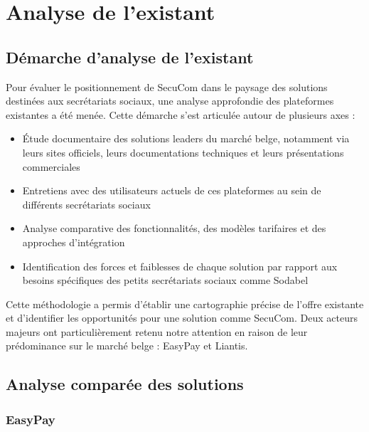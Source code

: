 \chapter{Analyse de l'existant}

\section{Démarche d'analyse de l'existant}

Pour évaluer le positionnement de SecuCom dans le paysage des solutions destinées aux secrétariats sociaux, une analyse approfondie des plateformes existantes a été menée. Cette démarche s'est articulée autour de plusieurs axes :

\begin{itemize}
  \item Étude documentaire des solutions leaders du marché belge, notamment via leurs sites officiels, leurs documentations techniques et leurs présentations commerciales
  \item Entretiens avec des utilisateurs actuels de ces plateformes au sein de différents secrétariats sociaux
  \item Analyse comparative des fonctionnalités, des modèles tarifaires et des approches d'intégration
  \item Identification des forces et faiblesses de chaque solution par rapport aux besoins spécifiques des petits secrétariats sociaux comme Sodabel
\end{itemize}

Cette méthodologie a permis d'établir une cartographie précise de l'offre existante et d'identifier les opportunités pour une solution comme SecuCom. Deux acteurs majeurs ont particulièrement retenu notre attention en raison de leur prédominance sur le marché belge : EasyPay et Liantis.

\section{Analyse comparée des solutions}

\subsection{EasyPay}


